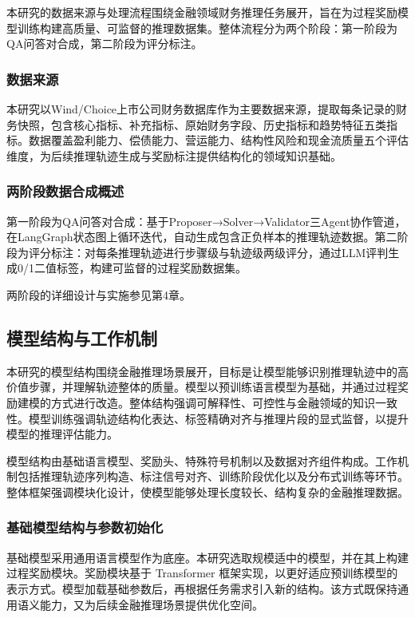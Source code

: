 \documentclass[professional,privacy,print,win,long,STEM,AutoFakeBold]{def/buaa}
\begin{document}
本研究的数据来源与处理流程围绕金融领域财务推理任务展开，旨在为过程奖励模型训练构建高质量、可监督的推理数据集。整体流程分为两个阶段：第一阶段为QA问答对合成，第二阶段为评分标注。

\subsubsection{数据来源}

本研究以Wind/Choice上市公司财务数据库作为主要数据来源，提取每条记录的财务快照，包含核心指标、补充指标、原始财务字段、历史指标和趋势特征五类指标。数据覆盖盈利能力、偿债能力、营运能力、结构性风险和现金流质量五个评估维度，为后续推理轨迹生成与奖励标注提供结构化的领域知识基础。

\subsubsection{两阶段数据合成概述}

第一阶段为QA问答对合成：基于Proposer→Solver→Validator三Agent协作管道，在LangGraph状态图上循环迭代，自动生成包含正负样本的推理轨迹数据。第二阶段为评分标注：对每条推理轨迹进行步骤级与轨迹级两级评分，通过LLM评判生成0/1二值标签，构建可监督的过程奖励数据集。

两阶段的详细设计与实施参见第4章。


\subsection{模型结构与工作机制}

本研究的模型结构围绕金融推理场景展开，目标是让模型能够识别推理轨迹中的高价值步骤，并理解轨迹整体的质量。模型以预训练语言模型为基础，并通过过程奖励建模的方式进行改造。整体结构强调可解释性、可控性与金融领域的知识一致性。模型训练强调轨迹结构化表达、标签精确对齐与推理片段的显式监督，以提升模型的推理评估能力。

模型结构由基础语言模型、奖励头、特殊符号机制以及数据对齐组件构成。工作机制包括推理轨迹序列构造、标注信号对齐、训练阶段优化以及分布式训练等环节。整体框架强调模块化设计，使模型能够处理长度较长、结构复杂的金融推理数据。

\subsubsection{基础模型结构与参数初始化}

基础模型采用通用语言模型作为底座。本研究选取规模适中的模型，并在其上构建过程奖励模块。奖励模块基于 Transformer 框架实现，以更好适应预训练模型的表示方式。模型加载基础参数后，再根据任务需求引入新的结构。该方式既保持通用语义能力，又为后续金融推理场景提供优化空间。
\end{document}
